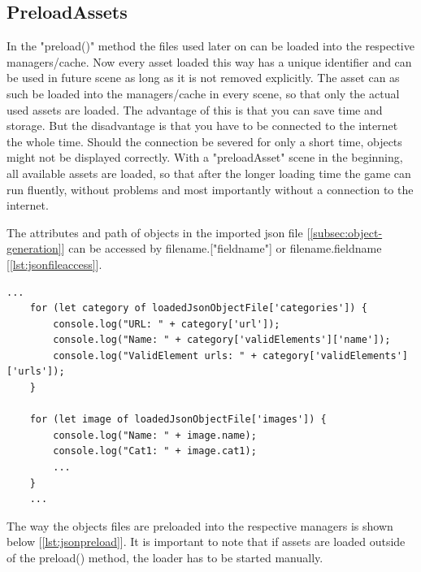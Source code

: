 \subsection{PreloadAssets}\label{subsec:preloadassets}
In the "preload()" method the files used later on can be loaded into the respective managers/cache.
Now every asset loaded this way has a unique identifier and can be used in future scene
as long as it is not removed explicitly.
The asset can as such be loaded into the managers/cache in every scene,
so that only the actual used assets are loaded.
The advantage of this is that you can save time and storage.
But the disadvantage is that you have to be connected to the internet the whole time.
Should the connection be severed for only a short time, objects might not be displayed correctly.
With a "preloadAsset" scene in the beginning, all available assets are loaded,
so that after the longer loading time the game can run fluently,
without problems and most importantly without a connection to the internet.

The attributes and path of objects in the imported json file [\ref{subsec:object-generation}]
can be accessed by filename.["fieldname"] or filename.fieldname [\ref{lst:jsonfileaccess}].

\begin{lstlisting}[style=TypeScript, caption={Example json file access}, label={lst:jsonfileaccess}]
    ...
    for (let category of loadedJsonObjectFile['categories']) {
        console.log("URL: " + category['url']);
        console.log("Name: " + category['validElements']['name']);
        console.log("ValidElement urls: " + category['validElements']['urls']);
    }

    for (let image of loadedJsonObjectFile['images']) {
        console.log("Name: " + image.name);
        console.log("Cat1: " + image.cat1);
        ...
    }
    ...
\end{lstlisting}

The way the objects files are preloaded into the respective managers is shown below [\ref{lst:jsonpreload}].
It is important to note that if assets are loaded outside of the preload() method,
the loader has to be started manually.

